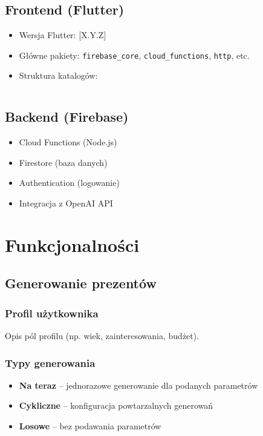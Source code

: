 \documentclass[a4paper, 12pt]{article}
\begin{document}
\subsection{Frontend (Flutter)}
\begin{itemize}
    \item Wersja Flutter: [X.Y.Z]
    \item Główne pakiety: \texttt{firebase\_core}, \texttt{cloud\_functions}, \texttt{http}, etc.
    \item Struktura katalogów:
    \begin{lstlisting}[language=bash]
    \end{lstlisting}
\end{itemize}

\subsection{Backend (Firebase)}
\begin{itemize}
    \item Cloud Functions (Node.js)
    \item Firestore (baza danych)
    \item Authentication (logowanie)
    \item Integracja z OpenAI API
\end{itemize}

\newpage
\section{Funkcjonalności}
\subsection{Generowanie prezentów}
\subsubsection{Profil użytkownika}
Opis pól profilu (np. wiek, zainteresowania, budżet).

\subsubsection{Typy generowania}
\begin{itemize}
    \item \textbf{Na teraz} – jednorazowe generowanie dla podanych parametrów
    \item \textbf{Cykliczne} – konfiguracja powtarzalnych generowań
    \item \textbf{Losowe} – bez podawania parametrów
\end{itemize}
\end{document}
